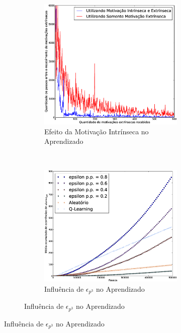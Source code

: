 \documentclass[kdmile,a4paper]{kdmile} %
\begin{document}
\begin{figure}
  \centering
  \begin{subfigure}[b]{\textwidth}
    \centering
    \begin{subfigure}[b]{0.47\textwidth}
      \includegraphics[width=\textwidth]{EfeitoMI}
      \caption{Efeito da Motivação Intrínseca no Aprendizado}
      \label{fig:mi}
    \end{subfigure}
    ~
    \begin{subfigure}[b]{0.47\textwidth}
      \includegraphics[width=\textwidth]{toyonxstep-mediaacum-epsopt-parcial-02-04-06-08}
      \caption{Influência de $\epsilon_{p^3}$ no Aprendizado}
      \label{fig:ep3}
    \end{subfigure}
  \end{subfigure}


\end{figure}
\end{document}
